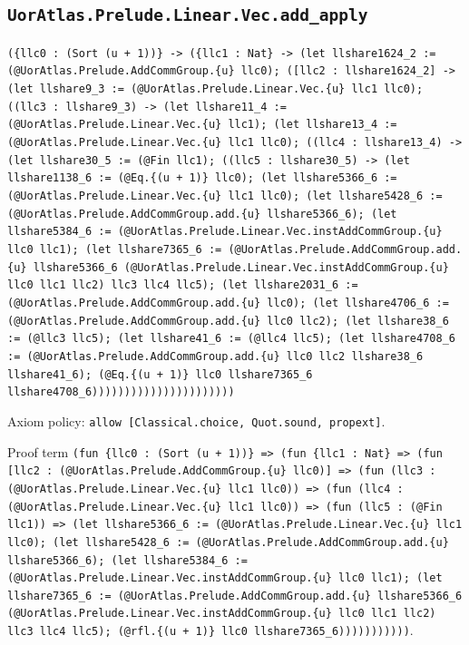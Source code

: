\documentclass[11pt]{article}
\begin{document}
\subsection*{\texttt{UorAtlas.Prelude.Linear.Vec.add\_apply}}
\noindent\texttt{(\{llc0 : (Sort (u + 1))\} -> (\{llc1 : Nat\} -> (let llshare1624\_2 := (@UorAtlas.Prelude.AddCommGroup.\{u\} llc0); ([llc2 : llshare1624\_2] -> (let llshare9\_3 := (@UorAtlas.Prelude.Linear.Vec.\{u\} llc1 llc0); ((llc3 : llshare9\_3) -> (let llshare11\_4 := (@UorAtlas.Prelude.Linear.Vec.\{u\} llc1); (let llshare13\_4 := (@UorAtlas.Prelude.Linear.Vec.\{u\} llc1 llc0); ((llc4 : llshare13\_4) -> (let llshare30\_5 := (@Fin llc1); ((llc5 : llshare30\_5) -> (let llshare1138\_6 := (@Eq.\{(u + 1)\} llc0); (let llshare5366\_6 := (@UorAtlas.Prelude.Linear.Vec.\{u\} llc1 llc0); (let llshare5428\_6 := (@UorAtlas.Prelude.AddCommGroup.add.\{u\} llshare5366\_6); (let llshare5384\_6 := (@UorAtlas.Prelude.Linear.Vec.instAddCommGroup.\{u\} llc0 llc1); (let llshare7365\_6 := (@UorAtlas.Prelude.AddCommGroup.add.\{u\} llshare5366\_6 (@UorAtlas.Prelude.Linear.Vec.instAddCommGroup.\{u\} llc0 llc1 llc2) llc3 llc4 llc5); (let llshare2031\_6 := (@UorAtlas.Prelude.AddCommGroup.add.\{u\} llc0); (let llshare4706\_6 := (@UorAtlas.Prelude.AddCommGroup.add.\{u\} llc0 llc2); (let llshare38\_6 := (@llc3 llc5); (let llshare41\_6 := (@llc4 llc5); (let llshare4708\_6 := (@UorAtlas.Prelude.AddCommGroup.add.\{u\} llc0 llc2 llshare38\_6 llshare41\_6); (@Eq.\{(u + 1)\} llc0 llshare7365\_6 llshare4708\_6))))))))))))))))))))))}\par
\noindent Axiom policy: \texttt{allow [Classical.choice, Quot.sound, propext]}.\par
\noindent Proof term \texttt{(fun \{llc0 : (Sort (u + 1))\} => (fun \{llc1 : Nat\} => (fun [llc2 : (@UorAtlas.Prelude.AddCommGroup.\{u\} llc0)] => (fun (llc3 : (@UorAtlas.Prelude.Linear.Vec.\{u\} llc1 llc0)) => (fun (llc4 : (@UorAtlas.Prelude.Linear.Vec.\{u\} llc1 llc0)) => (fun (llc5 : (@Fin llc1)) => (let llshare5366\_6 := (@UorAtlas.Prelude.Linear.Vec.\{u\} llc1 llc0); (let llshare5428\_6 := (@UorAtlas.Prelude.AddCommGroup.add.\{u\} llshare5366\_6); (let llshare5384\_6 := (@UorAtlas.Prelude.Linear.Vec.instAddCommGroup.\{u\} llc0 llc1); (let llshare7365\_6 := (@UorAtlas.Prelude.AddCommGroup.add.\{u\} llshare5366\_6 (@UorAtlas.Prelude.Linear.Vec.instAddCommGroup.\{u\} llc0 llc1 llc2) llc3 llc4 llc5); (@rfl.\{(u + 1)\} llc0 llshare7365\_6)))))))))))}.\par
\end{document}
